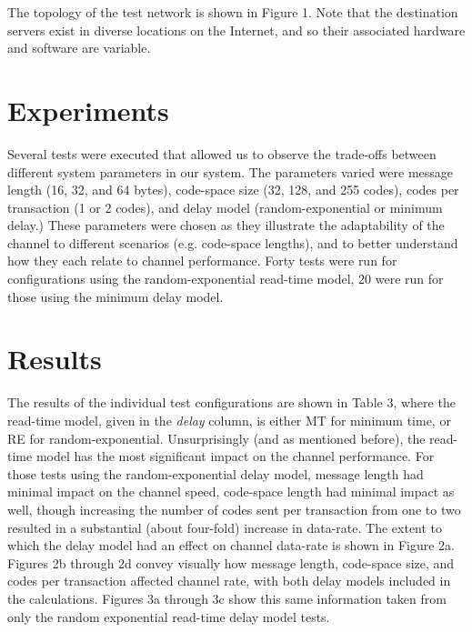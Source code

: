 \documentclass[10pt, conference]{IEEEtran}
\begin{document}
The topology of the test network is shown in Figure 1.  Note that the destination servers exist in diverse locations on the Internet, and so their associated hardware and software are variable.

\vspace{1cm}
\section{Experiments}
Several tests were executed that allowed us to observe the trade-offs between different system parameters in our system.  The parameters varied were message length (16, 32, and 64 bytes), code-space size (32, 128, and 255 codes), codes per transaction (1 or 2 codes), and delay model (random-exponential or minimum delay.)  These parameters were chosen as they illustrate the adaptability of the channel to different scenarios (e.g. code-space lengths), and to better understand how they each relate to channel performance.  Forty tests were run for configurations using the random-exponential read-time model, 20 were run for those using the minimum delay model.

\section{Results}
The results of the individual test configurations are shown in Table 3, where the read-time model, given in the {\em delay} column, is either MT for minimum time, or RE for random-exponential. Unsurprisingly (and as mentioned before), the read-time model has the most significant impact on the channel performance.  For those tests using the random-exponential delay model, message length had minimal impact on the channel speed, code-space length had minimal impact as well, though increasing the number of codes sent per transaction from one to two resulted in a substantial (about four-fold) increase in data-rate.  The extent to which the delay model had an effect on channel data-rate is shown in Figure 2a.  Figures 2b through 2d convey visually how message length, code-space size, and codes per transaction affected channel rate, with both delay models included in the calculations.  Figures 3a through 3c show this same information taken from only the random exponential read-time delay model tests.
\end{document}
